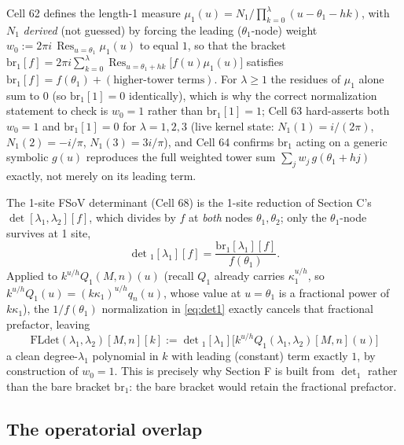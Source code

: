 \documentclass[11pt]{article}
\begin{document}
Cell 62 defines the length-1 measure $\mu_1(u) = N_1/\prod_{k=0}^{\lambda}(u-\theta_1-hk)$, with
$N_1$ \emph{derived} (not guessed) by forcing the leading ($\theta_1$-node) weight
$w_0 := 2\pi i\,\operatorname{Res}_{u=\theta_1}\mu_1(u)$ to equal $1$, so that the bracket
$\mathrm{br}_1[f] = 2\pi i\sum_{k=0}^{\lambda}\operatorname{Res}_{u=\theta_1+hk}\bigl[f(u)\mu_1(u)\bigr]$
satisfies $\mathrm{br}_1[f] = f(\theta_1) + (\text{higher-tower terms})$. For $\lambda\ge1$ the
residues of $\mu_1$ alone sum to $0$ (so $\mathrm{br}_1[1]=0$ identically), which is why the correct
normalization statement to check is $w_0=1$ rather than $\mathrm{br}_1[1]=1$; Cell 63 hard-asserts
both $w_0=1$ and $\mathrm{br}_1[1]=0$ for $\lambda=1,2,3$ (live kernel state:
$N_1(1)=i/(2\pi)$, $N_1(2)=-i/\pi$, $N_1(3)=3i/\pi$), and Cell 64 confirms $\mathrm{br}_1$ acting on
a generic symbolic $g(u)$ reproduces the full weighted tower sum $\sum_j w_j\,g(\theta_1+hj)$
exactly, not merely on its leading term.

The 1-site FSoV determinant (Cell 68) is the 1-site reduction of Section C's $\det[\lambda_1,
\lambda_2][f]$, which divides by $f$ at \emph{both} nodes $\theta_1,\theta_2$; only the
$\theta_1$-node survives at 1 site,
\begin{equation}
  \det{}_1[\lambda_1][f] = \frac{\mathrm{br}_1[\lambda_1][f]}{f(\theta_1)}.
  \label{eq:det1}
\end{equation}
Applied to $k^{u/h}Q_1(M,n)(u)$ (recall $Q_1$ already carries $\kappa_1^{u/h}$, so
$k^{u/h}Q_1(u) = (k\kappa_1)^{u/h}q_n(u)$, whose value at $u=\theta_1$ is a fractional power of
$k\kappa_1$), the $1/f(\theta_1)$ normalization in \eqref{eq:det1} exactly cancels that fractional
prefactor, leaving
\begin{equation}
  \mathrm{FLdet}(\lambda_1,\lambda_2)[M,n][k] := \det{}_1[\lambda_1]\bigl[k^{u/h}Q_1(\lambda_1,\lambda_2)[M,n](u)\bigr]
  \label{eq:fldet}
\end{equation}
a clean degree-$\lambda_1$ polynomial in $k$ with leading (constant) term exactly $1$, by
construction of $w_0=1$. This is precisely why Section F is built from $\det_1$ rather than the bare
bracket $\mathrm{br}_1$: the bare bracket would retain the fractional prefactor.

\subsection{The operatorial overlap}
\end{document}
